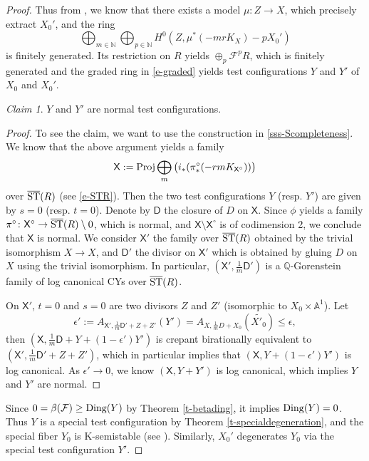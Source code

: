 \documentclass[12pt,reqno]{amsart}%
\newcommand{\cF}{\mathcal{F}}
\theoremstyle{definition}
\theoremstyle{remark}
\newtheorem{claim}[thm]{Claim}
\newcommand{\Ding}{{\rm Ding}}
\begin{document}
\begin{proof}
Thus from \cite{BCHM10}, we know that there exists a model $\mu\colon Z\to X$, which precisely extract $X_0'$, and 
the ring 
$$\bigoplus_{m\in \mathbb N}\bigoplus_{p\in \mathbb N}H^0(Z,\mu^*(-mrK_X)-pX_0')$$ 
is finitely generated. Its restriction on $R$ yields $\oplus_p\cF^pR$, which is finitely generated and the graded ring in \eqref{e-graded} yields test configurations $Y$ and $Y'$ of $X_0$ and $X_0'$.
\begin{claim} $Y$ and $Y'$ are normal test configurations. 
\end{claim}
\begin{proof}To see the claim, we want to use the construction in \ref{sss-Scompleteness}. We know that the above argument yields a family 
$$ \mathsf{X}:={\rm Proj}\bigoplus_m\big(i_*(\pi^{\circ}_*(-rmK_{ \mathsf{X}^{\circ}}))\big)$$
over $\overline{\rm ST}(R)$ (see \eqref{e-STR}). Then the two test configurations $Y$ (resp. $Y'$) are given by $s=0$ (resp. $t=0$). Denote by $\mathsf D$ the closure of $D$ on $\mathsf X$. Since  $\phi$ yields a family $\pi^{\circ}\colon \mathsf{X}^{\circ}\to \overline{\rm ST}(R)\setminus 0$, which is normal, and $ \mathsf{X}\setminus \mathsf{X}^{\circ}$ is of codimension 2, we conclude that $\mathsf{X}$ is normal. 
We consider $\mathsf{X}'$ the family over $\overline{\rm ST}(R)$ obtained by the trivial isomorphism $X\to X$, and $\mathsf{D}'$ the divisor on $ \mathsf{X}'$ which is obtained by gluing $D$ on $X$ using the trivial isomorphism. In particular,  $(\mathsf X', \frac 1m\mathsf D')$ is a $\mathbb{Q}$-Gorenstein family of log canonical CYs over $\overline{\rm ST}(R)$. 

On $\mathsf X'$,  $t=0$ and $s=0$ are two divisors $Z$ and $Z'$ (isomorphic to $X_0\times \mathbb{A}^1$). Let 
$$\epsilon':=A_{\mathsf X',\frac 1m \mathsf  D'+Z+Z'}(Y')=A_{X,\frac 1mD+X_0}(\widetilde{X'_0})\le \epsilon,$$
then $(\mathsf X,\frac 1m \mathsf  D+Y+(1-\epsilon')Y')$ is crepant birationally equivalent to $(\mathsf X',\frac 1m \mathsf  D'+Z+Z')$, which in particular implies that $(\mathsf X,Y+(1-\epsilon')Y')$ is log canonical. 
As $\epsilon'\to 0$, we know $(\mathsf X,Y+Y')$ is log canonical, which implies $Y$ and $Y'$ are normal.
\end{proof}
Since $0=\beta(\cF)\ge \Ding(Y)$ by Theorem \ref{t-betading}, it implies $\Ding(Y)=0$. Thus $Y$ is a special test configuration by Theorem \ref{t-specialdegeneration}, and the special fiber $Y_0$ is K-semistable (see \cite[Lemma 3.1]{LWX18}). Similarly, $X_0'$ degenerates $Y_0$ via the special test configuration $Y'$.
\end{proof}
\end{document}
